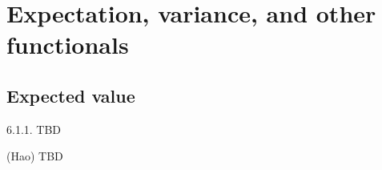 \newpage
\section{Expectation, variance, and other functionals}

\subsection{Expected value}

\begin{exercise}\label{6.1.1}
6.1.1. TBD
\end{exercise}
\begin{answer} (Hao)
    TBD
\end{answer}